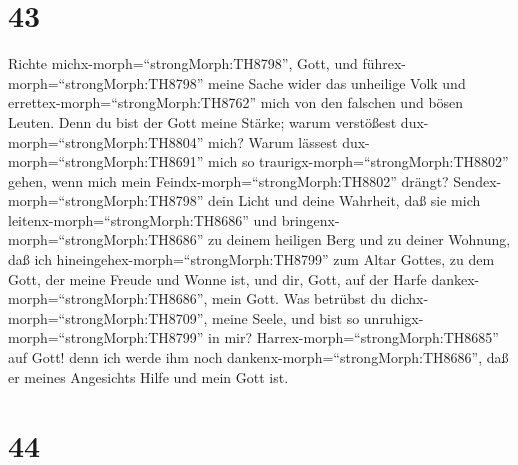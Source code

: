 \hypertarget{section-42}{%
\section{43}\label{section-42}}

 Richte michx-morph=``strongMorph:TH8798'', Gott, und
führex-morph=``strongMorph:TH8798'' meine Sache wider das unheilige Volk
und errettex-morph=``strongMorph:TH8762'' mich von den falschen und
bösen Leuten.  Denn du bist der Gott meine Stärke; warum
verstößest dux-morph=``strongMorph:TH8804'' mich? Warum lässest
dux-morph=``strongMorph:TH8691'' mich so
traurigx-morph=``strongMorph:TH8802'' gehen, wenn mich mein
Feindx-morph=``strongMorph:TH8802'' drängt? 
Sendex-morph=``strongMorph:TH8798'' dein Licht und deine Wahrheit, daß
sie mich leitenx-morph=``strongMorph:TH8686'' und
bringenx-morph=``strongMorph:TH8686'' zu deinem heiligen Berg und zu
deiner Wohnung,  daß ich
hineingehex-morph=``strongMorph:TH8799'' zum Altar Gottes, zu dem Gott,
der meine Freude und Wonne ist, und dir, Gott, auf der Harfe
dankex-morph=``strongMorph:TH8686'', mein Gott.  Was
betrübst du dichx-morph=``strongMorph:TH8709'', meine Seele, und bist so
unruhigx-morph=``strongMorph:TH8799'' in mir?
Harrex-morph=``strongMorph:TH8685'' auf Gott! denn ich werde ihm noch
dankenx-morph=``strongMorph:TH8686'', daß er meines Angesichts Hilfe und
mein Gott ist.

\hypertarget{section-43}{%
\section{44}\label{section-43}}

